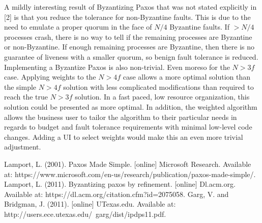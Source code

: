 \documentclass[conference]{IEEEtran}
\begin{document}
A mildly interesting result of Byzantizing Paxos that was not stated explicitly in [2] is that you reduce the tolerance for non-Byzantine faults. This is due to the need to emulate a proper quorum in the face of $N/4$ Byzantine faults. If $ > N/4$ processes crash, there is no way to tell if the remaining processes are Byzantine or non-Byzantine. If enough remaining processes are Byzantine, then there is no guarantee of liveness with a smaller quorum, so benign fault tolerance is reduced.
Implementing a Byzantize Paxos is also non-trivial. Even moreso for the $N > 3f$ case. Applying weights to the $N > 4f$ case allows a more optimal solution than the simple $N > 4f$ solution with less complicated modifications than required to reach the true $N > 3f$ solution. In a fast paced, low resource organization, this solution could be presented as more optimal. 
In addition, the weighted algorithm allows the business user to tailor the algorithm to their particular needs in regards to budget and fault tolerance requirements with minimal low-level code changes. Adding a UI to select weights would make this an even more trivial adjustment.

\begin{thebibliography}{00}
 Lamport, L. (2001). Paxos Made Simple. [online] Microsoft Research. Available at: https://www.microsoft.com/en-us/research/publication/paxos-made-simple/.
 Lamport, L. (2011). Byzantizing paxos by refinement. [online] Dl.acm.org. Available at: https://dl.acm.org/citation.cfm?id=2075058.
 Garg, V. and Bridgman, J. (2011). [online] UTexas.edu. Available at: http://users.ece.utexas.edu/~garg/dist/ipdps11.pdf.
\end{thebibliography}
\vspace{12pt}
\end{document}
